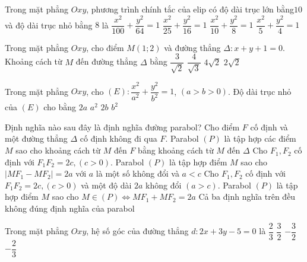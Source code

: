 \begin{ex}%
	Trong mặt phẳng $Oxy$, phương trình chính tắc của elip có độ dài trục lớn bằng$10$ và độ dài trục nhỏ bằng $8$ là
	\choice
	{$\dfrac{x^2}{100}+\dfrac{y^2}{64}=1$}
	{\True $\dfrac{x^2}{25}+\dfrac{y^2}{16}=1$}
	{$\dfrac{x^2}{10}+\dfrac{y^2}{8}=1$}
	{$\dfrac{x^2}{5}+\dfrac{y^2}{4}=1$}
\end{ex}
	\begin{ex}%
		Trong mặt phẳng $Oxy$, cho điểm $M(1;2)$ và đường thẳng $\Delta\colon x + y + 1 = 0$. Khoảng cách từ $M$ đến đường thẳng $\Delta$ bằng
		\choice
		{$\dfrac{3}{\sqrt{2}}$}
		{$\dfrac{4}{\sqrt{3}}$}
		{$4\sqrt{2}$}
		{\True $2\sqrt{2}$}
	\end{ex}
\begin{ex}%
	Trong mặt phẳng $Oxy$, cho $(E) \colon \dfrac{x^2}{a^2}+\dfrac{y^2}{b^2}=1$, $(a>b>0)$. Độ dài trục nhỏ của $(E)$ cho bằng
	\choice
	{$2a$}
	{$a^2$}
	{\True $2b$}
	{$b^2$}
\end{ex}

	\begin{ex}%
		Định nghĩa nào sau đây là định nghĩa đường parabol?
		\choice
		{\True Cho điểm $F$ cố định và một đường thẳng $\Delta$ cố định không đi qua $F$. Parabol $(P)$ là tập hợp các điểm $M$ sao cho khoảng cách từ $M$ đến $F$ bằng khoảng cách từ $M$ đến $\Delta$}
		{Cho $F_{1}, F_{2}$ cố định với $F_{1}F_{2}=2c, (c>0)$. Parabol $(P)$ là tập hợp điểm $M$ sao cho $|MF_{1}-MF_{2}| =2a$ với $a$ là một số không đổi và $a<c$}
		{Cho $F_{1}, F_{2}$ cố định với $F_{1}F_{2}=2c, (c>0)$ và một độ dài $2a$ không đổi $(a>c)$. Parabol $(P)$ là tập hợp điểm $M$ sao cho $M \in (P) \Leftrightarrow MF_{1}+MF_{2} =2a$}
		{Cả ba định nghĩa trên đều không đúng định nghĩa của parabol}
	\end{ex}

	\begin{ex}%
		Trong mặt phẳng $Oxy$, hệ số góc của đường thẳng $d\colon 2x + 3y - 5 = 0$ là
		\choice
		{$\dfrac{2}{3}$}
		{$\dfrac{3}{2}$}
		{$-\dfrac{3}{2}$}
		{\True $-\dfrac{2}{3}$}
	\end{ex}
	
